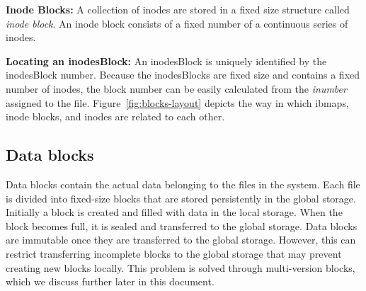 \documentclass[]{article}
\newcommand{\subtopic}[1]{\vspace{1.5pt} \noindent \textbf{#1}}
\begin{document}
\subtopic{Inode Blocks:} A collection of inodes are stored in a fixed size
structure called \textit{inode block}. An inode block consists of a fixed
number of a continuous series of inodes. 


\subtopic{Locating an inodesBlock:} An inodesBlock is uniquely identified by
the inodesBlock number.  Because the inodesBlocks are fixed size and contains a
fixed number of inodes, the block number can be easily calculated from the
\textit{inumber} assigned to the file.
Figure~\ref{fig:blocks-layout} depicts the way in which ibmaps, inode blocks, and
inodes are related to each other.




\subsection{Data blocks}

Data blocks contain the actual data belonging to the files in the system.
Each file is divided into fixed-size blocks that are stored persistently in
the global storage. Initially a block is created and filled with data
in the local storage. When the block becomes full, it is sealed and transferred 
to the global storage. Data blocks are immutable once they are transferred
to the global storage. However, this can restrict transferring incomplete
blocks to the global storage that may prevent creating new blocks locally.
This problem is solved through multi-version blocks, which we discuss
further later in this document.
\end{document}
